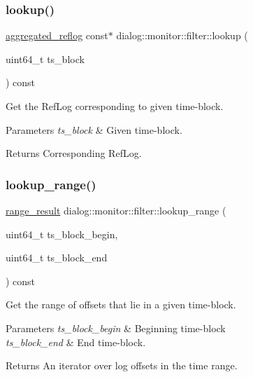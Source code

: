 \subsubsection{\texorpdfstring{lookup()}{lookup()}}
{\footnotesize\ttfamily \hyperlink{classdialog_1_1aggregated__reflog}{aggregated\+\_\+reflog} const$\ast$ dialog\+::monitor\+::filter\+::lookup (\begin{DoxyParamCaption}\item[{uint64\+\_\+t}]{ts\+\_\+block }\end{DoxyParamCaption}) const\hspace{0.3cm}{\ttfamily [inline]}}

Get the Ref\+Log corresponding to given time-\/block.


\begin{DoxyParams}{Parameters}
{\em ts\+\_\+block} & Given time-\/block. \\
\hline
\end{DoxyParams}
\begin{DoxyReturn}{Returns}
Corresponding Ref\+Log. 
\end{DoxyReturn}
\mbox{\label{classdialog_1_1monitor_1_1filter_a5523a17cb88d0f5bd6b78bb16c085632}} 
\subsubsection{\texorpdfstring{lookup\+\_\+range()}{lookup\_range()}}
{\footnotesize\ttfamily \hyperlink{classflattened__container}{range\+\_\+result} dialog\+::monitor\+::filter\+::lookup\+\_\+range (\begin{DoxyParamCaption}\item[{uint64\+\_\+t}]{ts\+\_\+block\+\_\+begin,  }\item[{uint64\+\_\+t}]{ts\+\_\+block\+\_\+end }\end{DoxyParamCaption}) const\hspace{0.3cm}{\ttfamily [inline]}}

Get the range of offsets that lie in a given time-\/block.


\begin{DoxyParams}{Parameters}
{\em ts\+\_\+block\+\_\+begin} & Beginning time-\/block \\
\hline
{\em ts\+\_\+block\+\_\+end} & End time-\/block. \\
\hline
\end{DoxyParams}
\begin{DoxyReturn}{Returns}
An iterator over log offsets in the time range. 
\end{DoxyReturn}
\mbox{\label{classdialog_1_1monitor_1_1filter_aa84bc2df90155d5fd462dce52d86de5c}} 
